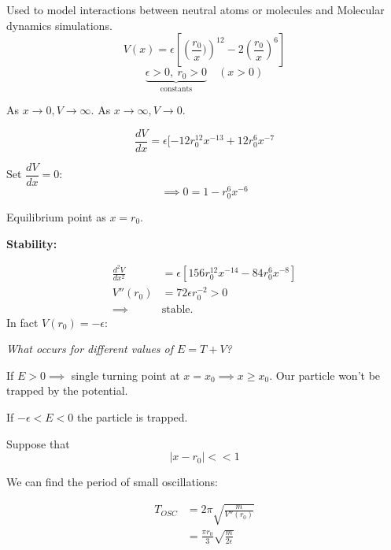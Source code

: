 \documentclass[twoside]{scrartcl}
\begin{document}
\begin{example}

Used to model interactions between neutral atoms or molecules and Molecular dynamics simulations.
\[V(x) = \epsilon\left[\left(\frac{r_0}{x})\right)^{12} -2\left(\frac{r_0}{x}\right)^6\right]\]
\[\underbrace{\epsilon >0,~r_0 > 0}_{\text{constants}}\quad (x>0)\]

As $x \to 0, V \to \infty$. As $x \to \infty, V \to 0$. 

\[\frac{dV}{dx} = \epsilon[-12r_0^{12}x^{-13} + 12r_0^6x^{-7}\]

Set $\dfrac{dV}{dx} = 0$:
\[\implies 0 = 1-r_0^6x^{-6}\]

Equilibrium point as $x = r_0$. 

\textbf{Stability:} 

\[
\begin{aligned}
  \frac{d^2V}{dx^2} &= \epsilon[156r_0^{12}x^{-14} -84r_0^6x^{-8}]\\
  V''(r_0) &= 72\epsilon r_0^{-2} > 0\\
  \implies &\text{stable.}
\end{aligned}
\]
In fact $V(r_0) = -\epsilon$: 
  \begin{center}
  \end{center}
  
  	 
\emph{What occurs for different values of $E = T + V$?}

If $E >0 \implies$ single turning point at $x = x_0 \implies x \geq x_0$. Our particle won't be trapped by the potential. 

If $-\epsilon < E < 0$ the particle is trapped. 

Suppose that 
\[|x-r_0| << 1\]

We can find the period of small oscillations: 

\[
\begin{aligned}
  T_{OSC} &= 2\pi\sqrt{\frac{m}{V''(r_0)}}\\
  &= \frac{\pi r_0}{3}\sqrt{\frac{m}{2\epsilon}}
\end{aligned}
\]

\end{example}~
\end{document}
